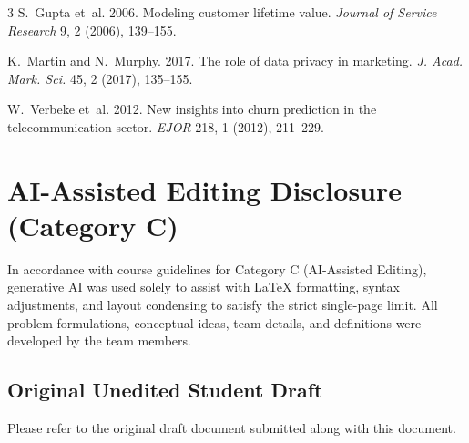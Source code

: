 \documentclass[sigconf,nonacm]{acmart}
\begin{document}
\begin{thebibliography}{3}
\small
\setlength{\itemsep}{0pt}
S.~Gupta et~al. 2006. Modeling customer lifetime value. \emph{Journal of Service Research} 9, 2 (2006), 139--155.

K.~Martin and N.~Murphy. 2017. The role of data privacy in marketing. \emph{J. Acad. Mark. Sci.} 45, 2 (2017), 135--155.

W.~Verbeke et~al. 2012. New insights into churn prediction in the telecommunication sector. \emph{EJOR} 218, 1 (2012), 211--229.
\end{thebibliography}

\newpage
\appendix
\section{AI-Assisted Editing Disclosure (Category C)}
In accordance with course guidelines for Category C (AI-Assisted Editing), generative AI was used solely to assist with LaTeX formatting, syntax adjustments, and layout condensing to satisfy the strict single-page limit. All problem formulations, conceptual ideas, team details, and definitions were developed by the team members.

\subsection{Original Unedited Student Draft}
Please refer to the original draft document submitted along with this document.
\end{document}
